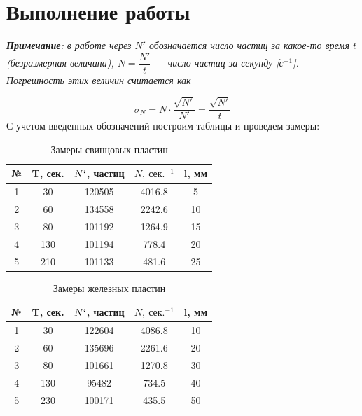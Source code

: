 \documentclass[a4paper,12pt]{article} %
\begin{document}
	\section{Выполнение работы}
	
	\textit{\textbf{Примечание}: в работе через $ N' $ обозначается число частиц за какое-то время $ t $ (безразмерная величина), $ N = \dfrac{N'}{t} $ --- число частиц за секунду [с$ ^{-1} $]. Погрешность этих величин считается как} 
	
	\begin{equation}\label{}
		\sigma_N = N \cdot \dfrac{\sqrt{N'}}{N'} = \dfrac{\sqrt{N'}}{t}
	\end{equation}
	С учетом введенных обозначений построим таблицы и проведем замеры:

	\begin{table}[H]
		\centering
		\begin{tabular}{|c|c|c|c|c|}
			\hline
			№ & T, сек.   & $N`$, частиц     & $N, ~\text{сек.}^{-1}$ & l, мм \\ \hline
			1      & 30  & 120505 & 4016.8                   & 5     \\ \hline
			2      & 60  & 134558 & 2242.6                   & 10    \\ \hline
			3      & 80  & 101192 & 1264.9                   & 15    \\ \hline
			4      & 130 & 101194 & 778.4                    & 20    \\ \hline
			5      & 210 & 101133 & 481.6                    & 25    \\ \hline
		\end{tabular}
		\caption{Замеры свинцовых пластин}
	\end{table}
	\begin{table}[H]
		\centering
		\begin{tabular}{|c|c|c|c|c|}
			\hline
			№ & T, сек.   & $N`$, частиц     & $N, ~\text{сек.}^{-1}$ & l, мм \\ \hline
			1      & 30  & 122604 & 4086.8                   & 10    \\ \hline
			2      & 60  & 135696 & 2261.6                   & 20    \\ \hline
			3      & 80  & 101661 & 1270.8                   & 30    \\ \hline
			4      & 130 & 95482  & 734.5                    & 40    \\ \hline
			5      & 230 & 100171 & 435.5                    & 50    \\ \hline
		\end{tabular}
	\caption{Замеры железных пластин}
	\end{table}
\end{document}
